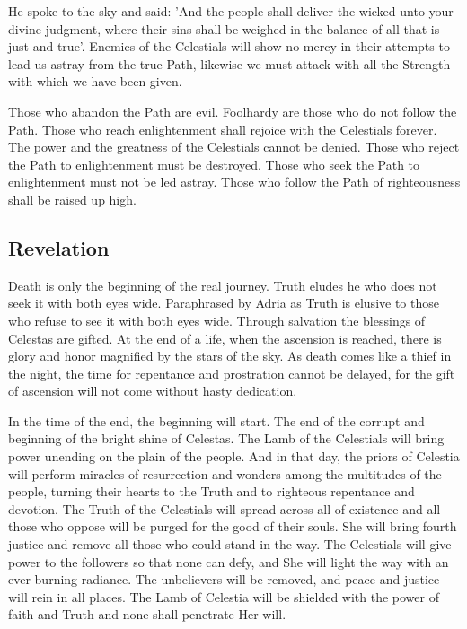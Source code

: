 He spoke to the sky and said: 'And the people shall deliver the wicked unto your divine judgment, where their sins shall be weighed in the balance of all that is just and true'. Enemies of the Celestials will show no mercy in their attempts to lead us astray from the true Path, likewise we must attack with all the Strength with which we have been given. 

Those who abandon the Path are evil. Foolhardy are those who do not follow the Path. Those who reach enlightenment shall rejoice with the Celestials forever. The power and the greatness of the Celestials cannot be denied. Those who reject the Path to enlightenment must be destroyed. Those who seek the Path to enlightenment must not be led astray. Those who follow the Path of righteousness shall be raised up high. 

\subsection{Revelation}

Death is only the beginning of the real journey. Truth eludes he who does not seek it with both eyes wide. Paraphrased by Adria as Truth is elusive to those who refuse to see it with both eyes wide. Through salvation the blessings of Celestas are gifted. At the end of a life, when the ascension is reached, there is glory and honor magnified by the stars of the sky. As death comes like a thief in the night, the time for repentance and prostration cannot be delayed, for the gift of ascension will not come without hasty dedication.

In the time of the end, the beginning will start. The end of the corrupt and beginning of the bright shine of Celestas. The Lamb of the Celestials will bring power unending on the plain of the people. And in that day, the priors of Celestia will perform miracles of resurrection and wonders among the multitudes of the people, turning their hearts to the Truth and to righteous repentance and devotion. The Truth of the Celestials will spread across all of existence and all those who oppose will be purged for the good of their souls. She will bring fourth justice and remove all those who could stand in the way. The Celestials will give power to the followers so that none can defy, and She will light the way with an ever-burning radiance. The unbelievers will be removed, and peace and justice will rein in all places. The Lamb of Celestia will be shielded with the power of faith and Truth and none shall penetrate Her will.	

